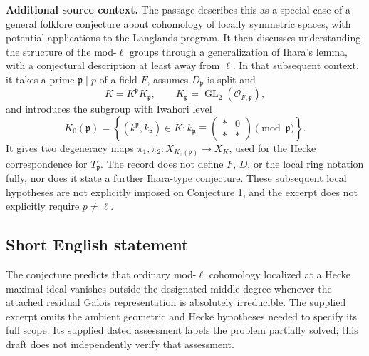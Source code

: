 \documentclass[11pt]{article}
\begin{document}
\textbf{Additional source context.} The passage describes this as a special case of a general folklore conjecture about cohomology of locally symmetric spaces, with potential applications to the Langlands program. It then discusses understanding the structure of the mod-\(\ell\) groups through a generalization of Ihara's lemma, with a conjectural description at least away from \(\ell\). In that subsequent context, it takes a prime \(\mathfrak p\mid p\) of a field \(F\), assumes \(D_{\mathfrak p}\) is split and
\[
K=K^{\mathfrak p}K_{\mathfrak p},
\qquad K_{\mathfrak p}=\operatorname{GL}_2(\mathcal O_{F,\mathfrak p}),
\]
and introduces the subgroup with Iwahori level
\[
K_0(\mathfrak p)=
\left\{(k^{\mathfrak p},k_{\mathfrak p})\in K:
 k_{\mathfrak p}\equiv
 \begin{pmatrix} *&0\\ *&*\end{pmatrix}
 \pmod{\mathfrak p}\right\}.
\]
It gives two degeneracy maps \(\pi_1,\pi_2:X_{K_0(\mathfrak p)}\to X_K\), used for the Hecke correspondence for \(T_{\mathfrak p}\). The record does not define \(F\), \(D\), or the local ring notation fully, nor does it state a further Ihara-type conjecture. These subsequent local hypotheses are not explicitly imposed on Conjecture 1, and the excerpt does not explicitly require \(p\neq\ell\).
\subsection{Short English statement}
The conjecture predicts that ordinary mod-\(\ell\) cohomology localized at a Hecke maximal ideal vanishes outside the designated middle degree whenever the attached residual Galois representation is absolutely irreducible. The supplied excerpt omits the ambient geometric and Hecke hypotheses needed to specify its full scope. Its supplied dated assessment labels the problem partially solved; this draft does not independently verify that assessment.
\end{document}
